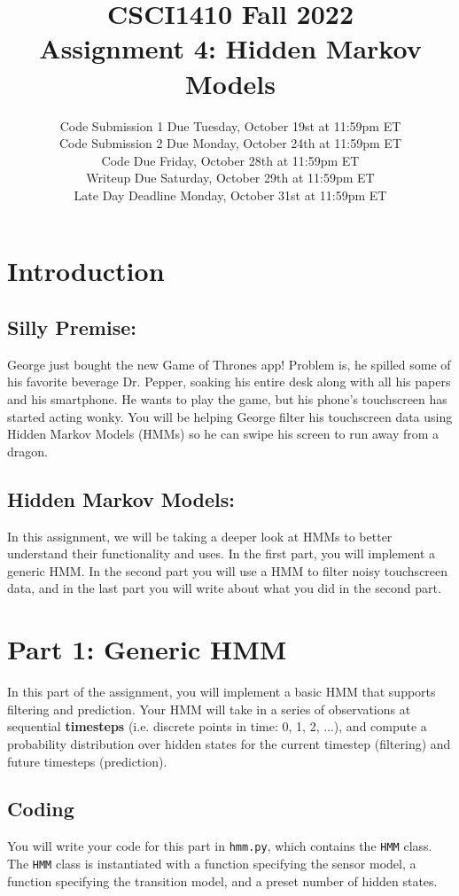\documentclass{article}
\title{CSCI1410 Fall 2022 \\
Assignment 4: Hidden Markov Models}
\date{%
Code Submission 1 Due Tuesday, October 19st at 11:59pm ET\\ [1ex]
Code Submission 2 Due Monday, October 24th at 11:59pm ET\\ [1ex]
Code Due Friday, October 28th at 11:59pm ET\\ [1ex]
Writeup Due Saturday, October 29th at 11:59pm ET\\ [1ex]
Late Day Deadline Monday, October 31st at 11:59pm ET
}
\author{}
\begin{document}
\maketitle

\section*{Introduction}

\subsection*{Silly Premise:}
George just bought the new Game of Thrones app! Problem is, he spilled some of his favorite beverage Dr. Pepper, soaking his entire desk along with all his papers and his smartphone. He wants to play the game, but his phone's touchscreen has started acting wonky. You will be helping George filter his touchscreen data using Hidden Markov Models (HMMs) so he can swipe his screen to run away from a dragon.

\subsection*{Hidden Markov Models:}
In this assignment, we will be taking a deeper look at HMMs to better understand their functionality and uses. In the first part, you will implement a generic HMM. In the second part you will use a HMM to filter noisy touchscreen data, and in the last part you will write about what you did in the second part.

\section{Part 1: Generic HMM}
In this part of the assignment, you will implement a basic HMM that supports filtering and prediction. Your HMM will take in a series of observations at sequential \textbf{timesteps} (i.e. discrete points in time: 0, 1, 2, ...), and compute a probability distribution over hidden states for the current timestep (filtering) and future timesteps (prediction).

\subsection{Coding}
You will write your code for this part in \texttt{hmm.py}, which contains the \texttt{HMM} class. The \texttt{HMM} class is instantiated with a function specifying the sensor model, a function specifying the transition model, and a preset number of hidden states.
\end{document}
